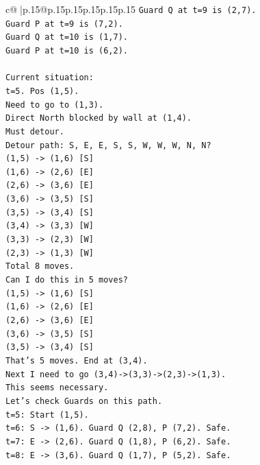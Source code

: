 \documentclass{article}
\begin{document}
{\begin{supertabular}{c@{$\;$}|p{.15\linewidth}@{}p{.15\linewidth}p{.15\linewidth}p{.15\linewidth}p{.15\linewidth}p{.15\linewidth}}
{{{\texttt{Guard Q at t=9 is (2,7).} \\
\texttt{Guard P at t=9 is (7,2).} \\
\texttt{Guard Q at t=10 is (1,7).} \\
\texttt{Guard P at t=10 is (6,2).} \\
\\ 
\texttt{Current situation:} \\
\texttt{t=5. Pos (1,5).} \\
\texttt{Need to go to (1,3).} \\
\texttt{Direct North blocked by wall at (1,4).} \\
\texttt{Must detour.} \\
\texttt{Detour path: S, E, E, S, S, W, W, W, N, N?} \\
\texttt{(1,5) {-}> (1,6) {[}S{]}} \\
\texttt{(1,6) {-}> (2,6) {[}E{]}} \\
\texttt{(2,6) {-}> (3,6) {[}E{]}} \\
\texttt{(3,6) {-}> (3,5) {[}S{]}} \\
\texttt{(3,5) {-}> (3,4) {[}S{]}} \\
\texttt{(3,4) {-}> (3,3) {[}W{]}} \\
\texttt{(3,3) {-}> (2,3) {[}W{]}} \\
\texttt{(2,3) {-}> (1,3) {[}W{]}} \\
\texttt{Total 8 moves.} \\
\texttt{Can I do this in 5 moves?} \\
\texttt{(1,5) {-}> (1,6) {[}S{]}} \\
\texttt{(1,6) {-}> (2,6) {[}E{]}} \\
\texttt{(2,6) {-}> (3,6) {[}E{]}} \\
\texttt{(3,6) {-}> (3,5) {[}S{]}} \\
\texttt{(3,5) {-}> (3,4) {[}S{]}} \\
\texttt{That's 5 moves. End at (3,4).} \\
\texttt{Next I need to go (3,4){-}>(3,3){-}>(2,3){-}>(1,3).} \\
\texttt{This seems necessary.} \\
\texttt{Let's check Guards on this path.} \\
\texttt{t=5: Start (1,5).} \\
\texttt{t=6: S {-}> (1,6). Guard Q (2,8), P (7,2). Safe.} \\
\texttt{t=7: E {-}> (2,6). Guard Q (1,8), P (6,2). Safe.} \\
\texttt{t=8: E {-}> (3,6). Guard Q (1,7), P (5,2). Safe.} \\
}}}
\end{supertabular}}
\end{document}
